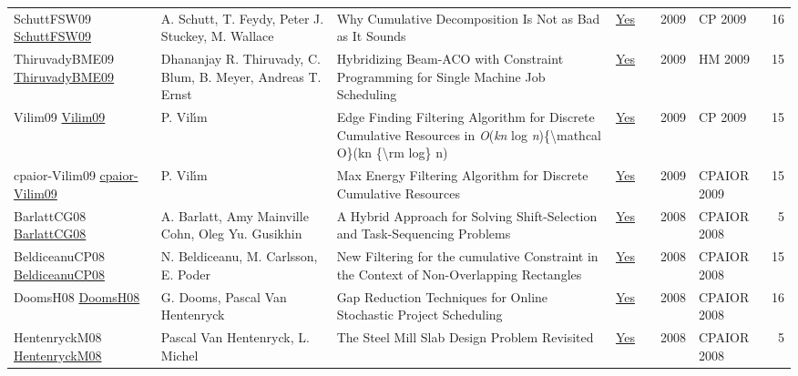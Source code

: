 {\begin{longtable}{p{3cm}p{6cm}p{7cm}rrrp{3cm}r}
SchuttFSW09 \href{https://doi.org/10.1007/978-3-642-04244-7\_58}{SchuttFSW09} & A. Schutt, T. Feydy, Peter J. Stuckey, M. Wallace & Why Cumulative Decomposition Is Not as Bad as It Sounds & \href{papers/SchuttFSW09.pdf}{Yes} & \cite{SchuttFSW09} & 2009 & CP 2009 & 16\\
ThiruvadyBME09 \href{https://doi.org/10.1007/978-3-642-04918-7\_3}{ThiruvadyBME09} & Dhananjay R. Thiruvady, C. Blum, B. Meyer, Andreas T. Ernst & Hybridizing Beam-ACO with Constraint Programming for Single Machine Job Scheduling & \href{papers/ThiruvadyBME09.pdf}{Yes} & \cite{ThiruvadyBME09} & 2009 & HM 2009 & 15\\
Vilim09 \href{https://doi.org/10.1007/978-3-642-04244-7\_62}{Vilim09} & P. Vil{\'{\i}}m & Edge Finding Filtering Algorithm for Discrete Cumulative Resources in \emph{O}(\emph{kn} log \emph{n})\{{\textbackslash}mathcal O\}(kn \{{\textbackslash}rm log\} n) & \href{papers/Vilim09.pdf}{Yes} & \cite{Vilim09} & 2009 & CP 2009 & 15\\
cpaior-Vilim09 \href{https://doi.org/10.1007/978-3-642-01929-6\_22}{cpaior-Vilim09} & P. Vil{\'{\i}}m & Max Energy Filtering Algorithm for Discrete Cumulative Resources & \href{papers/cpaior-Vilim09.pdf}{Yes} & \cite{cpaior-Vilim09} & 2009 & CPAIOR 2009 & 15\\
BarlattCG08 \href{https://doi.org/10.1007/978-3-540-68155-7\_24}{BarlattCG08} & A. Barlatt, Amy Mainville Cohn, Oleg Yu. Gusikhin & A Hybrid Approach for Solving Shift-Selection and Task-Sequencing Problems & \href{papers/BarlattCG08.pdf}{Yes} & \cite{BarlattCG08} & 2008 & CPAIOR 2008 & 5\\
BeldiceanuCP08 \href{https://doi.org/10.1007/978-3-540-68155-7\_5}{BeldiceanuCP08} & N. Beldiceanu, M. Carlsson, E. Poder & New Filtering for the cumulative Constraint in the Context of Non-Overlapping Rectangles & \href{papers/BeldiceanuCP08.pdf}{Yes} & \cite{BeldiceanuCP08} & 2008 & CPAIOR 2008 & 15\\
DoomsH08 \href{https://doi.org/10.1007/978-3-540-68155-7\_8}{DoomsH08} & G. Dooms, Pascal Van Hentenryck & Gap Reduction Techniques for Online Stochastic Project Scheduling & \href{papers/DoomsH08.pdf}{Yes} & \cite{DoomsH08} & 2008 & CPAIOR 2008 & 16\\
HentenryckM08 \href{https://doi.org/10.1007/978-3-540-68155-7\_41}{HentenryckM08} & Pascal Van Hentenryck, L. Michel & The Steel Mill Slab Design Problem Revisited & \href{papers/HentenryckM08.pdf}{Yes} & \cite{HentenryckM08} & 2008 & CPAIOR 2008 & 5\\

\end{longtable}}
